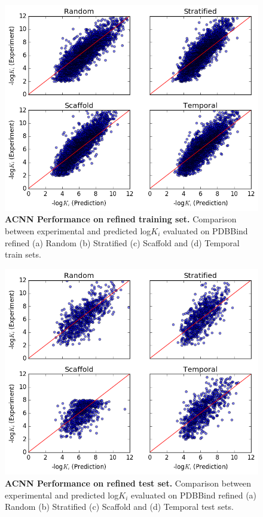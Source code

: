 \begin{figure}
    \centering
    \includegraphics[width=\textwidth]{Images/acnn_refined_train.png}
    \caption{\textbf{ACNN Performance on refined training set.} Comparison between experimental and predicted log$K_i$ evaluated on PDBBind refined (a) Random (b) Stratified (c) Scaffold and (d) Temporal train sets.}
    \label{fig:acnn_core_train}
\end{figure}
\begin{figure}
    \centering
    \includegraphics[width=\textwidth]{Images/acnn_refined_test.png}
    \caption{\textbf{ACNN Performance on refined test set.} Comparison between experimental and predicted log$K_i$ evaluated on PDBBind refined (a) Random (b) Stratified (c) Scaffold and (d) Temporal test sets.}
    \label{fig:acnn_core_test}
\end{figure}
